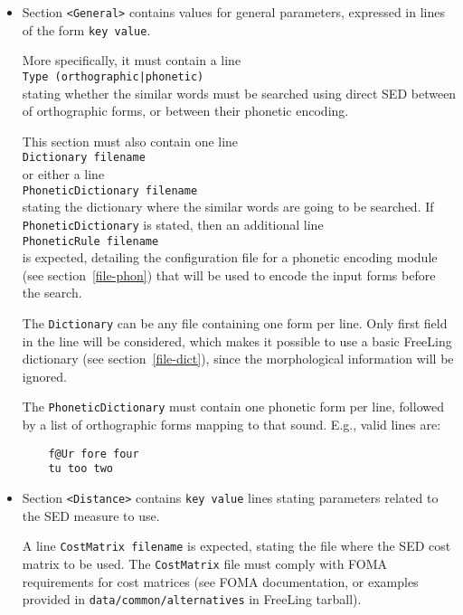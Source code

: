 \documentclass[a4paper]{book}
\begin{document}
 \begin{itemize}
   \item Section \verb#<General># contains values for general parameters, expressed
    in lines of the form \verb#key value#.

    More specifically, it must contain a line\\
    \verb#Type (orthographic|phonetic)#\\
    stating whether the similar words must be searched using direct SED between
    of orthographic forms, or between their phonetic encoding.

    This section must also contain one line\\
    \verb#Dictionary filename#\\
    or either a line\\
    \verb#PhoneticDictionary filename#\\
    stating the dictionary where the 
    similar words are going to be searched.
    If \verb#PhoneticDictionary# is stated, then an additional line\\
    \verb#PhoneticRule filename#\\
    is expected, detailing the configuration file 
    for a phonetic encoding module (see section~\ref{file-phon}) that
    will be used to encode the input forms before the search.

    The \verb#Dictionary# can be any file containing one form per line. 
    Only first field in the line will be considered, which makes it possible
    to use a basic FreeLing dictionary (see section~\ref{file-dict}), since
    the morphological information will be ignored.

    The \verb#PhoneticDictionary# must contain one phonetic form per line, followed
    by a list of orthographic forms mapping to that sound. E.g., valid lines are:
    \begin{verbatim}
    f@Ur fore four
    tu too two
    \end{verbatim}

  \item Section \verb#<Distance># contains \verb#key value# lines stating
    parameters related to the SED measure to use.

    A line \verb#CostMatrix filename# is expected, stating the file where
    the SED cost matrix to be used. The \verb#CostMatrix# file must comply
    with FOMA requirements for cost matrices (see FOMA documentation, or
    examples provided in \verb#data/common/alternatives# in FreeLing tarball).


\end{itemize}
\end{document}
